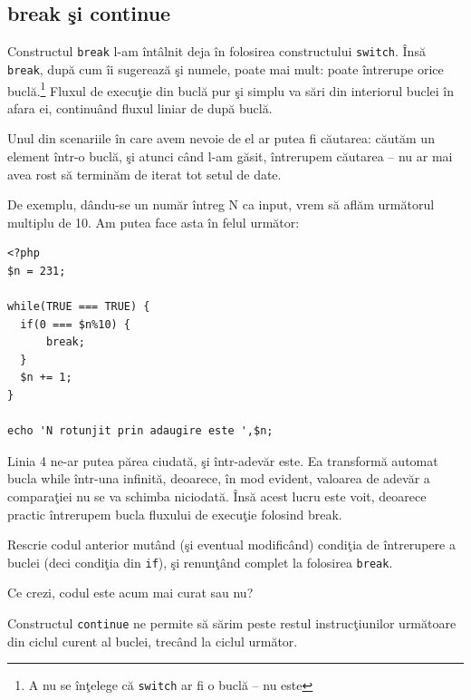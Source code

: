 \subsection{break şi continue}
Constructul \texttt{break} l-am întâlnit deja în folosirea constructului
\texttt{switch}. Însă \texttt{break}, după cum îi sugerează şi numele, poate
mai mult: poate întrerupe orice buclă.\footnote{A nu se înţelege că \texttt{switch} ar fi o buclă -- nu este}
Fluxul de execuţie din buclă pur şi simplu
va sări din interiorul buclei în afara ei, continuând fluxul liniar
de după buclă.

Unul din scenariile în care avem nevoie de el ar putea fi căutarea:
căutăm un element într-o buclă, şi atunci când l-am găsit, întrerupem
căutarea -- nu ar mai avea rost să terminăm de iterat tot setul de date.

De exemplu, dându-se un număr întreg N ca input, vrem să aflăm următorul
multiplu de 10. Am putea face asta în felul următor:

\begin{lstlisting}
<?php
$n = 231;

while(TRUE === TRUE) {
  if(0 === $n%10) {
	  break;
  }
  $n += 1;
}

echo 'N rotunjit prin adaugire este ',$n;
\end{lstlisting}

Linia 4 ne-ar putea părea ciudată, şi într-adevăr este.
Ea transformă automat bucla while într-una infinită,
deoarece, în mod evident, valoarea de adevăr a comparaţiei nu se va schimba
niciodată. Însă acest lucru este voit, deoarece practic întrerupem
bucla fluxului de execuţie folosind break.



\begin{Exercise}[title={Majoritatea buclelor infinite pot fi corectate}]
Rescrie codul anterior mutând (şi eventual modificând) condiţia
de întrerupere a buclei (deci condiţia din \texttt{if}),
şi renunţând complet la folosirea \texttt{break}.

Ce crezi, codul este acum mai curat sau nu?
\end{Exercise}

Constructul \texttt{continue} ne permite să
sărim peste restul instrucţiunilor următoare
din ciclul curent al buclei, trecând la ciclul următor.

